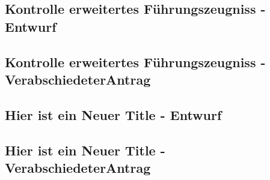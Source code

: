 \documentclass[12pt,a4paper]{scrartcl}
\begin{document}
\subsection*{Kontrolle erweitertes Führungszeugniss - Entwurf} \label{An:1}
%
\subsection*{Kontrolle erweitertes Führungszeugniss - VerabschiedeterAntrag} \label{An:2}
%
\subsection*{Hier ist ein Neuer Title - Entwurf} \label{An:3}
%
\subsection*{Hier ist ein Neuer Title - VerabschiedeterAntrag} \label{An:4}
%
\end{document}
